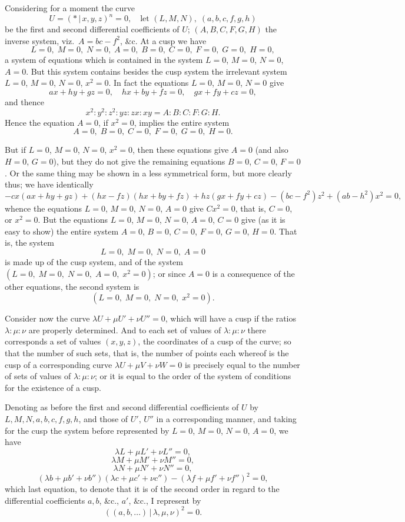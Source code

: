 \documentclass[11pt,a4paper]{article}
\providecommand{\mid}{\,|\,}
\begin{document}
Considering for a moment the curve
\[
U = (* \mid x, y, z)^n = 0,\quad\text{let }(L, M, N),\; (a, b, c, f, g, h)
\]
be the first and second differential coefficients of $U$; $(A, B, C, F, G, H)$ the inverse system, viz.\ $A = bc - f^2$, \&c. At a cusp we have
\[
L = 0,\;M = 0,\;N = 0,\;A = 0,\;B = 0,\;C = 0,\;F = 0,\;G = 0,\;H = 0,
\]
a system of equations which is contained in the system $L = 0$, $M = 0$, $N = 0$, $A = 0$. But this system contains besides the cusp system the irrelevant system $L = 0$, $M = 0$, $N = 0$, $x^2 = 0$. In fact the equations $L = 0$, $M = 0$, $N = 0$ give
\[
ax + hy + gz = 0,\quad hx + by + fz = 0,\quad gx + fy + cz = 0,
\]
and thence
\[
x^2 : y^2 : z^2 : yz : zx : xy = A : B : C : F : G : H.
\]
Hence the equation $A = 0$, if $x^2 = 0$, implies the entire system
\[
A = 0,\; B = 0,\; C = 0,\; F = 0,\; G = 0,\; H = 0.
\]

But if $L = 0$, $M = 0$, $N = 0$, $x^2 = 0$, then these equations give $A = 0$ (and also $H = 0$, $G = 0$), but they do not give the remaining equations $B = 0$, $C = 0$, $F = 0$. Or the same thing may be shown in a less symmetrical form, but more clearly thus; we have identically
\[
-cx(ax + hy + gz) + (hx - fz)(hx + by + fz) + hz(gx + fy + cz) - (bc - f^2)z^2 + (ab - h^2)x^2 = 0,
\]
whence the equations $L = 0$, $M = 0$, $N = 0$, $A = 0$ give $Cx^2 = 0$, that is, $C = 0$, or $x^2 = 0$. But the equations $L = 0$, $M = 0$, $N = 0$, $A = 0$, $C = 0$ give (as it is easy to show) the entire system $A = 0$, $B = 0$, $C = 0$, $F = 0$, $G = 0$, $H = 0$. That is, the system
\[
L = 0,\;M = 0,\;N = 0,\;A = 0
\]
is made up of the cusp system, and of the system $(L = 0,\;M = 0,\;N = 0,\;A = 0,\;x^2 = 0)$; or since $A = 0$ is a consequence of the other equations, the second system is
\[
(L = 0,\;M = 0,\;N = 0,\;x^2 = 0).
\]

\medskip

Consider now the curve $\lambda U + \mu U' + \nu U'' = 0$, which will have a cusp if the ratios $\lambda : \mu : \nu$ are properly determined. And to each set of values of $\lambda : \mu : \nu$ there corresponds a set of values $(x, y, z)$, the coordinates of a cusp of the curve; so that the number of such sets, that is, the number of points each whereof is the cusp of a corresponding curve $\lambda U + \mu V + \nu W = 0$ is precisely equal to the number of sets of values of $\lambda : \mu : \nu$; or it is equal to the order of the system of conditions for the existence of a cusp.

Denoting as before the first and second differential coefficients of $U$ by $L, M, N, a, b, c, f, g, h$, and those of $U'$, $U''$ in a corresponding manner, and taking for the cusp the system before represented by $L = 0$, $M = 0$, $N = 0$, $A = 0$, we have
\[
\lambda L + \mu L' + \nu L'' = 0,
\]
\[
\lambda M + \mu M' + \nu M'' = 0,
\]
\[
\lambda N + \mu N' + \nu N'' = 0,
\]
\[
(\lambda b + \mu b' + \nu b'')(\lambda c + \mu c' + \nu c'') - (\lambda f + \mu f' + \nu f'')^2 = 0,
\]
which last equation, to denote that it is of the second order in regard to the differential coefficients $a, b$, \&c., $a'$, \&c., I represent by
\[
((a, b, \ldots)\mid \lambda, \mu, \nu)^2 = 0.
\]
\end{document}
